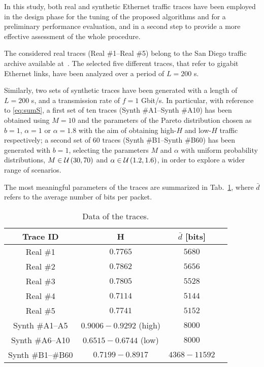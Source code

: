 \documentclass[journal,10pt,twoside,final]{IEEEtran}
\begin{document}
In this study, both real and synthetic Ethernet traffic traces have been employed in the design phase for the tuning of the proposed algorithms and for a preliminary performance evaluation, and in a second step to provide a more effective assessment of the whole procedure.

The considered real traces (Real \#1--Real \#5) belong to the San Diego traffic archive available at~\cite{tracce2}. The selected five different traces, that refer to gigabit  Ethernet links, have been analyzed over a period of $L=200$ s. 

Similarly, two sets of synthetic traces have been generated with a length of $L=200$ s, and a transmission rate of $f=1$ Gbit/s. In particular, with reference to \eqref{eq:sumS}, a first set of ten traces (Synth \#A1--Synth \#A10) has been obtained using $M=10$ and the parameters of the Pareto distribution chosen as $b = 1$, ${\alpha = 1}$ or ${\alpha = 1.8}$ with the aim of obtaining high-$H$ and low-$H$ traffic respectively; a second set of 60 traces (Synth \#B1--Synth \#B60) has been generated with $b = 1$, selecting the parameters $M$ and $\alpha$ with uniform probability distributions, $M\in {\cal U}\left(30,70\right)$ and $\alpha\in {\cal U}\left(1.2,1.6\right)$, in order to explore a wider range of scenarios.

The most meaningful parameters of the traces are summarized in Tab.~\ref{tab:data}, where $\bar d$ refers to the average number of bits per packet.

\begin{table}[h]
\caption{Data of the traces.}
\label{tab:data}
\begin{center}
\begin{tabular}{|c|c|c|c|}
\hline 
Trace ID & H &  $\bar{d}$ [bits] \\                         
\hline 
\hline 
Real \#1 & $0.7765$ &  $5680$\\
Real \#2 & $0.7862$ &  $5656$\\
Real \#3 & $0.7805$ &  $5528$\\
Real \#4 & $0.7114$ &  $5144$\\
Real \#5 & $0.7741$ &  $5152$\\
\hline
\hline 
Synth \#A1--A5 & $0.9006-0.9292$ (high) &  $8000$\\
Synth \#A6--A10 & $0.6515-0.6744$ (low) & $8000$\\
\hline 
\hline
Synth \#B1--\#B60 & $0.7199-0.8917$ & $4368-11592$\\
\hline
\end{tabular} 
\end{center}
\end{table}
\end{document}

